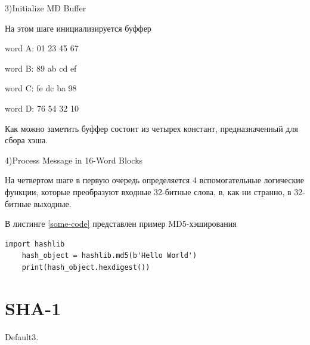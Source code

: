 \documentclass[a4paper, 12pt, oneside]{scrartcl}
\begin{document}
    3)Initialize MD Buffer\par
    На этом шаге инициализируется буффер\par
    word A: 01 23 45 67\par
    word B: 89 ab cd ef\par
    word C: fe dc ba 98\par
    word D: 76 54 32 10\par
    Как можно заметить буффер состоит из четырех констант, предназначенный для сбора хэша.\par
    4)Process Message in 16-Word Blocks\par
    На четвертом шаге в первую очередь определяется 4 вспомогательные логические функции, которые преобразуют входные 32-битные слова, в, как ни странно, в 32-битные выходные.\par

    В листинге \ref{some-code} представлен пример MD5-хэширования\par

\begin{lstlisting}[label=some-code,caption= MD5]
    import hashlib
    hash_object = hashlib.md5(b'Hello World')
    print(hash_object.hexdigest())
\end{lstlisting}
    \section{SHA-1}\label{sec:section3}
    Default3.
    
    
\end{document}
